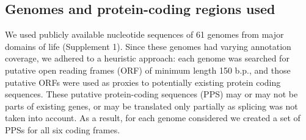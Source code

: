 \subsection{Genomes and protein-coding regions used}
\label{gen_n_prot_cod_regs}
We used publicly available nucleotide sequences of 61 genomes from major
domains of life (Supplement 1). Since these genomes had varying annotation
coverage, we adhered to a heuristic approach: each genome was searched for
putative open reading frames (ORF) of minimum length 150 b.p., and those
putative ORFs were used as proxies to potentially existing protein coding
sequences. These putative protein-coding sequences (PPS) may or may not be
parts of existing genes, or may be translated only partially as splicing was
not taken into account. As a result, for each genome considered we created a
set of PPSs for all six coding frames.

